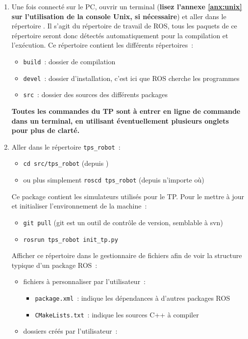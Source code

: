 \documentclass[12pt,a4paper]{article}
\begin{document}
\begin{enumerate}
\item Une fois connecté sur le PC, ouvrir un terminal (\textbf{lisez  l'annexe \ref{anx:unix} sur l'utilisation de la console Unix, si nécessaire}) et aller dans le répertoire \texttt{\ros}. Il s'agit du répertoire de travail de ROS, tous les paquets de ce répertoire seront donc détectés automatiquement pour la compilation et l'exécution.  Ce répertoire contient les différents répertoires~:
\begin{itemize}
\item \texttt{build}~: dossier de compilation
\item \texttt{devel}~: dossier d'installation, c'est ici que ROS cherche les programmes
\item \texttt{src}~: dossier des sources des différents packages
\end{itemize}
\textbf{Toutes les commandes du TP sont à entrer  en ligne de commande dans un terminal, en utilisant éventuellement plusieurs onglets pour plus de clarté.}
\item Aller dans le répertoire \texttt{tps\_robot}~: 
\begin{itemize}
\item \texttt{cd src/tps\_robot} (depuis \texttt{\ros})
\item ou plus simplement \texttt{roscd tps\_robot} (depuis n'importe où)
\end{itemize}
Ce package contient les simulateurs utilisés pour le TP. Pour le mettre à jour et initialiser l'environnement de la machine~:
\begin{itemize}
\item \texttt{git pull} (git est un outil de contrôle de version, semblable à svn)
\item \texttt{rosrun tps\_robot init\_tp.py}
\end{itemize}
Afficher ce répertoire dans le gestionnaire de fichiers afin de voir la structure typique d'un package ROS~:
\begin{itemize}
\item fichiers à personnaliser par l'utilisateur~:
\begin{itemize}
\item \texttt{package.xml}~: indique les dépendances à d'autres packages ROS
\item \texttt{CMakeLists.txt}~: indique les sources C++ à compiler
\end{itemize} 
\item dossiers créés par l'utilisateur~:

\end{itemize}
\end{enumerate}
\end{document}
